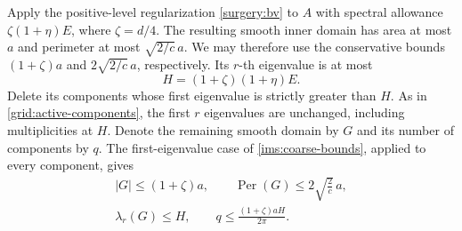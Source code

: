 \documentclass[11pt,reqno]{amsart}
\numberwithin{equation}{section}
\newcommand{\abs}[1]{\lvert#1\rvert}
\begin{document}
Apply the positive-level regularization \eqref{surgery:bv} to $A$
with spectral allowance $\zeta(1+\eta)E$, where $\zeta=d/4$.
The resulting smooth inner domain has area at most $a$ and perimeter
at most $\sqrt{2/c}\,a$.  We may therefore use the conservative
bounds $(1+\zeta)a$ and $2\sqrt{2/c}\,a$, respectively.  Its
$r$-th eigenvalue is at most
\[
 H=(1+\zeta)(1+\eta)E.
\]
Delete its components whose first eigenvalue is strictly greater
than $H$.  As in \eqref{grid:active-components}, the first $r$
eigenvalues are unchanged, including multiplicities at $H$.
Denote the remaining smooth domain by $G$ and its number of
components by $q$.  The first-eigenvalue case of
\eqref{ims:coarse-bounds}, applied to every component, gives
\begin{equation}
 \begin{gathered}
 \abs G\leq(1+\zeta)a,\qquad
 \operatorname{Per}(G)\leq2\sqrt{\frac2c}\,a,\\
 \lambda_r(G)\leq H,\qquad
 q\leq\frac{(1+\zeta)aH}{2\pi}.
 \end{gathered}
 \label{global:smooth-trace-output}
\end{equation}
\end{document}
